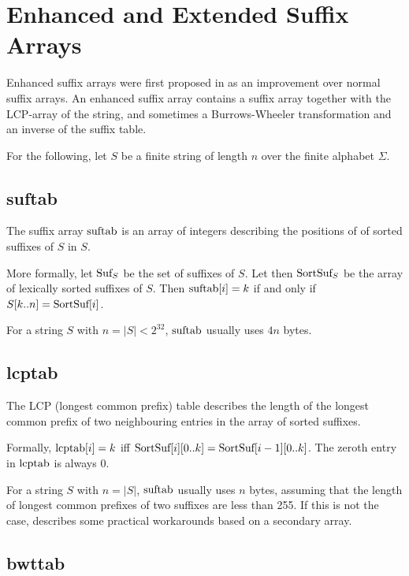 \documentclass[a4paper,10pt]{article}
\begin{document}
\section*{Enhanced and Extended Suffix Arrays}

Enhanced suffix arrays were first proposed in
\citealt{abouelhoda2002enhanced} as an improvement over normal suffix
arrays. An enhanced suffix array contains a suffix array together with the
LCP-array of the string, and sometimes a Burrows-Wheeler transformation
and an inverse of the suffix table.

For the following, let $S$ be a finite string of length $n$ over the
finite alphabet $\Sigma$.

\subsection*{suftab}

The suffix array $\hbox{suftab}$ is an array of integers describing the
positions of of sorted suffixes of $S$ in $S$.

More formally, let $\hbox{Suf}_{S}$ be the set of suffixes of $S$. Let
then $\hbox{SortSuf}_{S}$ be the array of lexically sorted suffixes of
$S$. Then $\hbox{suftab}[i]=k$ if and only if $S[k..n]=\hbox{SortSuf}[i]$.

For a string $S$ with $n=|S|<2^{32}$, $\hbox{suftab}$ usually uses $4n$
bytes.

\subsection*{lcptab}

The LCP (longest common prefix) table describes the length of the longest
common prefix of two neighbouring entries in the array of sorted suffixes.

Formally, $\hbox{lcptab}[i]=k$ iff
$\hbox{SortSuf}[i][0..k]=\hbox{SortSuf}[i-1][0..k]$. The zeroth entry
in $\hbox{lcptab}$ is always $0$.

For a string $S$ with $n=|S|$, $\hbox{suftab}$ usually uses $n$
bytes, assuming that the length of longest common prefixes
of two suffixes are less than 255. If this is not the case,
\citealt[sec. 8.1]{abouelhoda2004replacing} describes some practical
workarounds based on a secondary array.

\subsection*{bwttab}
\end{document}
